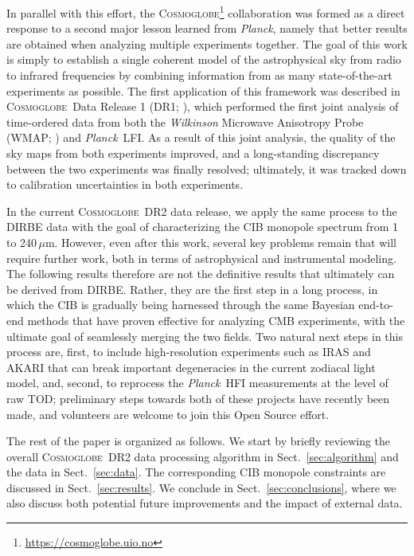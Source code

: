 \documentclass{aa}
\def\Cosmoglobe{\textsc{Cosmoglobe}}
\def\Planck{\textit{Planck}}
\newcommand{\cosmoglobe}{\textsc{Cosmoglobe}}
\begin{document}
In parallel with this effort, the \Cosmoglobe\footnote{\url{https://cosmoglobe.uio.no}} collaboration was formed as a direct response to a second major lesson learned from \Planck, namely that better results are obtained when analyzing multiple experiments together. The goal of this work is simply to establish a single coherent model of the astrophysical sky from radio to infrared frequencies by combining information from as many state-of-the-art experiments as possible. The first application of this framework was described in \cosmoglobe\ Data Release 1 (DR1; \citealp{watts2023_dr1}), which performed the first joint analysis of time-ordered data from both the \textit{Wilkinson} Microwave Anisotropy Probe (WMAP; \citealp{bennett2012}) and \Planck\ LFI. As a result of this joint analysis, the quality of the sky maps from both experiments improved, and a long-standing discrepancy between the two experiments was finally resolved; ultimately, it was tracked down to calibration uncertainties in both experiments.

In the current \cosmoglobe\ DR2 data release, we apply the same process to the DIRBE data with the goal of characterizing the CIB monopole spectrum from 1 to 240$\,\mu\mathrm{m}$. However, even after this work, several key problems remain that will require further work, both in terms of astrophysical and instrumental modeling. The following results therefore are not the definitive results that ultimately can be derived from DIRBE. Rather, they are the first step in a long process, in which the CIB is gradually being harnessed through the same Bayesian end-to-end methods that have proven effective for analyzing CMB experiments, with the ultimate goal of seamlessly merging the two fields. Two natural next steps in this process are, first, to include high-resolution experiments such as IRAS \citep{neugebauer:1984} and AKARI \citep{murakami:2007} that can break important degeneracies in the current zodiacal light model, and, second, to reprocess the \Planck\ HFI measurements at the level of raw TOD; preliminary steps towards both of these projects have recently been made, and volunteers are welcome to join this Open Source effort.


The rest of the paper is organized as follows.
We start by briefly reviewing the overall \cosmoglobe\ DR2 data processing algorithm in Sect.~\ref{sec:algorithm} and the data in Sect.~\ref{sec:data}. The corresponding CIB monopole constraints are discussed in Sect.~\ref{sec:results}. We conclude in Sect.~\ref{sec:conclusions}, where we also discuss both potential future improvements and the impact of external data.
\end{document}
